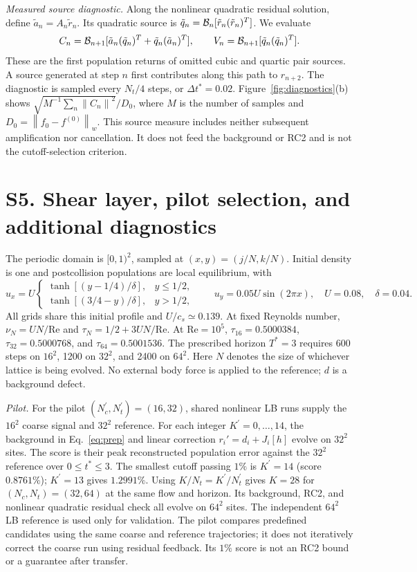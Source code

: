 \documentclass[10pt,letterpaper]{article}
\newcommand{\norm}[1]{\left\lVert#1\right\rVert}
\begin{document}
\textit{Measured source diagnostic.} Along the nonlinear quadratic residual solution, define $\tilde a_n=A_n\tilde r_n$. Its quadratic source is $\tilde q_n=\mathcal B_n[\tilde r_n(\tilde r_n)^T]$. We evaluate
\begin{equation}
 C_n=\mathcal B_{n+1}[\tilde a_n(\tilde q_n)^T+\tilde q_n(\tilde a_n)^T],\qquad
 V_n=\mathcal B_{n+1}[\tilde q_n(\tilde q_n)^T].
 \label{eq:returns}
\end{equation}
These are the first population returns of omitted cubic and quartic pair sources. A source generated at step $n$ first contributes along this path to $r_{n+2}$. The diagnostic is sampled every $N_t/4$ steps, or $\Delta t^*=0.02$. Figure~\ref{fig:diagnostics}(b) shows $\sqrt{M^{-1}\sum_n\norm{C_n}^2}/D_0$, where $M$ is the number of samples and $D_0=\norm{f_0-f^{(0)}}_w$. This source measure includes neither subsequent amplification nor cancellation. It does not feed the background or RC2 and is not the cutoff-selection criterion.

\section*{S5. Shear layer, pilot selection, and additional diagnostics}
The periodic domain is $[0,1)^2$, sampled at $(x,y)=(j/N,k/N)$. Initial density is one and postcollision populations are local equilibrium, with
\begin{equation}
 u_x=U\begin{cases}\tanh[(y-1/4)/\delta],&y\leq1/2,\\
 \tanh[(3/4-y)/\delta],&y>1/2,\end{cases}
 \qquad u_y=0.05U\sin(2\pi x),\quad U=0.08,\quad\delta=0.04.
\end{equation}
All grids share this initial profile and $U/c_s\simeq0.139$. At fixed Reynolds number, $\nu_N=UN/\mathrm{Re}$ and $\tau_N=1/2+3UN/\mathrm{Re}$. At $\mathrm{Re}=10^5$, $\tau_{16}=0.5000384$, $\tau_{32}=0.5000768$, and $\tau_{64}=0.5001536$. The prescribed horizon $T^*=3$ requires 600 steps on $16^2$, 1200 on $32^2$, and 2400 on $64^2$. Here $N$ denotes the size of whichever lattice is being evolved. No external body force is applied to the reference; $d$ is a background defect.

\textit{Pilot.} For the pilot $(N_c^\prime,N_t^\prime)=(16,32)$, shared nonlinear LB runs supply the $16^2$ coarse signal and $32^2$ reference. For each integer $K^\prime=0,\ldots,14$, the background in Eq.~\eqref{eq:prep} and linear correction $r_i'=d_i+J_i[h]$ evolve on $32^2$ sites. The score is their peak reconstructed population error against the $32^2$ reference over $0\leq t^*\leq3$. The smallest cutoff passing $1\%$ is $K^\prime=14$ (score $0.8761\%$); $K^\prime=13$ gives $1.2991\%$. Using $K/N_t=K^\prime/N_t^\prime$ gives $K=28$ for $(N_c,N_t)=(32,64)$ at the same flow and horizon. Its background, RC2, and nonlinear quadratic residual check all evolve on $64^2$ sites. The independent $64^2$ LB reference is used only for validation. The pilot compares predefined candidates using the same coarse and reference trajectories; it does not iteratively correct the coarse run using residual feedback. Its $1\%$ score is not an RC2 bound or a guarantee after transfer.
\end{document}
